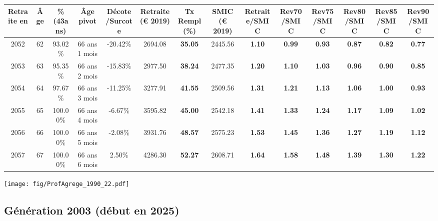 \begin{adjustbox}{max width=\textwidth} 
\begin{tabular}[htb]{|c|c||c|c|c||c|c||c||c|c|c|c|c|c|} 
\hline 
 Retraite en &  Âge &  \%(43ans) &  Âge pivot &  Décote/Surcote &  Retraite (\euro{} 2019) &  Tx Rempl(\%) &  SMIC (\euro{} 2019) &  Retraite/SMIC &  Rev70/SMIC &  Rev75/SMIC &  Rev80/SMIC &  Rev85/SMIC &  Rev90/SMIC \\ 
\hline \hline 
 2052 &  62 &  93.02\% &  66 ans 1 mois &  -20.42\% &  2694.08 &  {\bf 35.05} &  2445.56 &  {\bf 1.10} &  {\bf {\color{red} 0.99}} &  {\bf {\color{red} 0.93}} &  {\bf {\color{red} 0.87}} &  {\bf {\color{red} 0.82}} &  {\bf {\color{red} 0.77}} \\ 
\hline 
 2053 &  63 &  95.35\% &  66 ans 2 mois &  -15.83\% &  2977.50 &  {\bf 38.24} &  2477.35 &  {\bf 1.20} &  {\bf 1.10} &  {\bf 1.03} &  {\bf {\color{red} 0.96}} &  {\bf {\color{red} 0.90}} &  {\bf {\color{red} 0.85}} \\ 
\hline 
 2054 &  64 &  97.67\% &  66 ans 3 mois &  -11.25\% &  3277.91 &  {\bf 41.55} &  2509.56 &  {\bf 1.31} &  {\bf 1.21} &  {\bf 1.13} &  {\bf 1.06} &  {\bf {\color{red} 1.00}} &  {\bf {\color{red} 0.93}} \\ 
\hline 
 2055 &  65 &  100.00\% &  66 ans 4 mois &  -6.67\% &  3595.82 &  {\bf 45.00} &  2542.18 &  {\bf 1.41} &  {\bf 1.33} &  {\bf 1.24} &  {\bf 1.17} &  {\bf 1.09} &  {\bf 1.02} \\ 
\hline 
 2056 &  66 &  100.00\% &  66 ans 5 mois &  -2.08\% &  3931.76 &  {\bf 48.57} &  2575.23 &  {\bf 1.53} &  {\bf 1.45} &  {\bf 1.36} &  {\bf 1.27} &  {\bf 1.19} &  {\bf 1.12} \\ 
\hline 
 2057 &  67 &  100.00\% &  66 ans 6 mois &  2.50\% &  4286.30 &  {\bf 52.27} &  2608.71 &  {\bf 1.64} &  {\bf 1.58} &  {\bf 1.48} &  {\bf 1.39} &  {\bf 1.30} &  {\bf 1.22} \\ 
\hline 
\hline 
\end{tabular} 
\end{adjustbox} 
 
 \vspace{0.1cm} 

 \begin{center}\texttt{[image: fig/ProfAgrege\_1990\_22.pdf]}\end{center} \label{fig/ProfAgrege_1990_22.pdf} 

\newpage 
 
\subsection{Génération 2003 (début en 2025)} 

